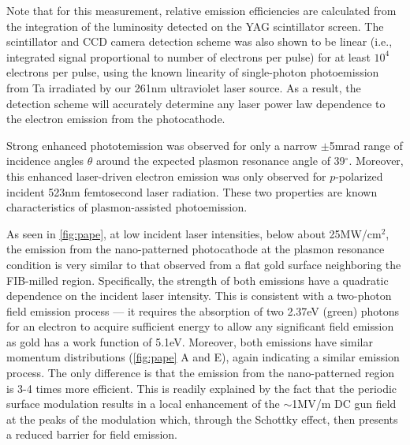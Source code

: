 Note that for this measurement, relative emission efficiencies are calculated from the integration of the luminosity detected on the YAG scintillator screen.
The scintillator and CCD camera detection scheme was also shown to be linear (i.e., integrated signal proportional to number of electrons per pulse) for at least $10^4$ electrons per pulse, using the known linearity of single-photon photoemission from Ta irradiated by our 261nm ultraviolet laser source.
As a result, the detection scheme will accurately determine any laser power law dependence to the electron emission from the photocathode.

Strong enhanced phototemission was observed for only a narrow $\pm$5mrad range of incidence angles $\theta$ around the expected plasmon resonance angle of 39$^{\circ}$.
Moreover, this enhanced laser-driven electron emission was only observed for $p$-polarized incident 523nm femtosecond laser radiation.
These two properties are known characteristics of plasmon-assisted photoemission.

As seen in \ref{fig:pape}, at low incident laser intensities, below about 25MW/cm$^2$, the emission from the nano-patterned photocathode at the plasmon resonance condition is very similar to that observed from a flat gold surface neighboring the FIB-milled region.
Specifically, the strength of both emissions have a quadratic dependence on the incident laser intensity.
This is consistent with a two-photon field emission process --- it requires the absorption of two 2.37eV (green) photons for an electron to acquire sufficient energy to allow any significant field emission as gold has a work function of 5.1eV.
Moreover, both emissions have similar momentum distributions (\ref{fig:pape} A and E), again indicating a similar emission process.
The only difference is that the emission from the nano-patterned region is 3-4 times more efficient.
This is readily explained by the fact that the periodic surface modulation results in a local enhancement of the $\sim$1MV/m DC gun field at the peaks of the modulation which, through the Schottky effect, then presents a reduced barrier for field emission.


